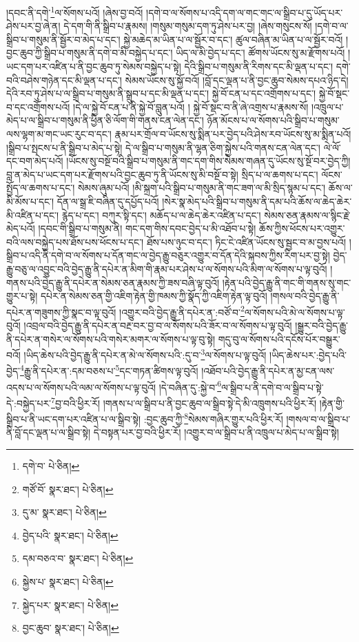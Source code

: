 །དབང་ནི་དགེ་\footnote{དགེ་བ་  པེ་ཅིན། }ལ་སོགས་པའོ། །ཞེས་བྱ་བའོ། །དགེ་བ་ལ་སོགས་པ་འདི་དག་ལ་གང་གང་ལ་སྒྲིབ་པ་དུ་ཡོད་པར་ཤེས་པར་བྱ་ཞེ་ན། དེ་དག་གི་ནི་སྒྲིབ་པ་རྣམས། །གསུམ་གསུམ་དག་ཏུ་ཤེས་པར་བྱ། །ཞེས་གསུངས་སོ། །དགེ་བ་ལ་སྒྲིབ་པ་གསུམ་ནི་སྦྱོར་བ་མེད་པ་དང་། སྐྱེ་མཆེད་མ་ཡིན་པ་ལ་སྦྱོར་བ་དང་། ཚུལ་བཞིན་མ་ཡིན་པ་ལ་སྦྱོར་བའོ། །བྱང་ཆུབ་ཀྱི་སྒྲིབ་པ་གསུམ་ནི་དགེ་བ་མི་བསྐྱེད་པ་དང་། ཡིད་ལ་མི་བྱེད་པ་དང་། ཚོགས་ཡོངས་སུ་མ་རྫོགས་པའོ། །ཡང་དག་པར་འཛིན་པ་ནི་བྱང་ཆུབ་ཏུ་སེམས་བསྐྱེད་པ་སྟེ། དེའི་སྒྲིབ་པ་གསུམ་ནི་རིགས་དང་མི་ལྡན་པ་དང་། དགེ་བའི་བཤེས་གཉེན་དང་མི་ལྡན་པ་དང་། སེམས་ཡོངས་སུ་སྐྱོ་བའོ། །བློ་དང་ལྡན་པ་ནི་བྱང་ཆུབ་སེམས་དཔའ་ཉིད་དེ། དེའི་རབ་ཏུ་ཤེས་པ་ལ་སྒྲིབ་པ་གསུམ་ནི་སྒྲུབ་པ་དང་མི་ལྡན་པ་དང་། སྐྱེ་བོ་ངན་པ་དང་འགྲོགས་པ་དང་། སྐྱེ་བོ་སྡང་བ་དང་འགྲོགས་པའོ། །དེ་ལ་སྐྱེ་བོ་ངན་པ་ནི་སྐྱེ་བོ་བླུན་པའོ། །
སྐྱེ་བོ་སྡང་བ་ནི་ཞེ་འགྲས་པ་རྣམས་སོ། །འཁྲུལ་པ་མེད་པ་ལ་སྒྲིབ་པ་གསུམ་ནི་ཕྱིན་ཅི་ལོག་གི་གནས་ངན་ལེན་དང་། ཉོན་མོངས་པ་ལ་སོགས་པའི་སྒྲིབ་པ་གསུམ་ལས་ལྷག་མ་གང་ཡང་རུང་བ་དང་། རྣམ་པར་གྲོལ་བ་ཡོངས་སུ་སྨིན་པར་བྱེད་པའི་ཤེས་རབ་ཡོངས་སུ་མ་སྨིན་པའོ། །སྒྲིབ་པ་སྤངས་པ་ནི་སྒྲིབ་པ་མེད་པ་སྟེ། དེ་ལ་སྒྲིབ་པ་གསུམ་ནི་ལྷན་ཅིག་སྐྱེས་པའི་གནས་ངན་ལེན་དང་། ལེ་ལོ་དང་བག་མེད་པའོ། །ཡོངས་སུ་བསྔོ་བའི་སྒྲིབ་པ་གསུམ་ནི་གང་དག་གིས་སེམས་གཞན་དུ་ཡོངས་སུ་སྔོ་བར་བྱེད་ཀྱི། བླ་ན་མེད་པ་ཡང་དག་པར་རྫོགས་པའི་བྱང་ཆུབ་ཏུ་ནི་ཡོངས་སུ་མི་བསྔོ་བ་སྟེ། སྲིད་པ་ལ་ཆགས་པ་དང་། ལོངས་སྤྱོད་ལ་ཆགས་པ་དང་། སེམས་ཞུམ་པའོ། །མི་སྐྲག་པའི་སྒྲིབ་པ་གསུམ་ནི་གང་ཟག་ལ་མི་སྲིད་སྙམ་པ་དང་། ཆོས་ལ་མི་མོས་པ་དང་། དོན་ལ་སྒྲ་ཇི་བཞིན་དུ་དཔྱོད་པའོ། །སེར་སྣ་མེད་པའི་སྒྲིབ་པ་གསུམ་ནི་དམ་པའི་ཆོས་ལ་ཆེད་ཆེར་མི་འཛིན་པ་དང་། རྙེད་པ་དང་། བཀུར་སྟི་དང་། མཆོད་པ་ལ་ཆེད་ཆེར་འཛིན་པ་དང་། སེམས་ཅན་རྣམས་ལ་སྙིང་རྗེ་མེད་པའོ། །དབང་གི་སྒྲིབ་པ་གསུམ་ནི། གང་དག་གིས་དབང་བྱེད་པ་མི་འཐོབ་པ་སྟེ། ཆོས་ཀྱིས་ཕོངས་པར་འགྱུར་བའི་ལས་བསྐྱེད་པས་ཐོས་པས་ཕོངས་པ་དང་། ཐོས་པས་ཉུང་བ་དང་། ཏིང་ངེ་འཛིན་ཡོངས་སུ་སྦྱང་བ་མ་བྱས་པའོ། །སྒྲིབ་པ་འདི་ནི་དགེ་བ་ལ་སོགས་པ་དོན་གང་ལ་བྱེད་རྒྱུ་བཅུར་འགྱུར་བ་དོན་དེའི་སྐབས་ཀྱིས་རིག་པར་བྱ་སྟེ། བྱེད་རྒྱུ་བཅུ་ལ་འབྱུང་བའི་བྱེད་རྒྱུ་ནི་དཔེར་ན་མིག་གི་རྣམ་པར་ཤེས་པ་ལ་སོགས་པའི་མིག་ལ་སོགས་པ་ལྟ་བུའོ། །གནས་པའི་བྱེད་རྒྱུ་ནི་དཔེར་ན་སེམས་ཅན་རྣམས་ཀྱི་ཟས་བཞི་ལྟ་བུའོ། །རྟེན་པའི་བྱེད་རྒྱུ་ནི་གང་གི་གནས་སུ་གང་གྱུར་པ་སྟེ། དཔེར་ན་སེམས་ཅན་གྱི་འཇིག་རྟེན་གྱི་ཁམས་ཀྱི་སྣོད་ཀྱི་འཇིག་རྟེན་ལྟ་བུའོ། །གསལ་བའི་བྱེད་རྒྱུ་ནི་དཔེར་ན་གཟུགས་ཀྱི་སྣང་བ་ལྟ་བུའོ། །འགྱུར་བའི་བྱེད་རྒྱུ་ནི་དཔེར་ན་:བཙོ་བ་\footnote{གཙོ་བོ་  སྣར་ཐང་།  པེ་ཅིན། }ལ་སོགས་པའི་མེ་ལ་སོགས་པ་ལྟ་བུའོ། །འབྲལ་བའི་བྱེད་རྒྱུ་ནི་དཔེར་ན་བརྔ་བར་བྱ་བ་ལ་སོགས་པའི་ཟོར་བ་ལ་སོགས་པ་ལྟ་བུའོ། །སྒྱུར་བའི་བྱེད་རྒྱུ་ནི་དཔེར་ན་གསེར་ལ་སོགས་པའི་གསེར་མགར་ལ་སོགས་པ་ལྟ་བུ་སྟེ། གདུ་བུ་ལ་སོགས་པའི་དངོས་པོར་བསྒྱུར་བའོ། །ཡིད་ཆེས་པའི་བྱེད་རྒྱུ་ནི་དཔེར་ན་མེ་ལ་སོགས་པའི་:དུ་བ་\footnote{དུ་མ་  སྣར་ཐང་།  པེ་ཅིན། }ལ་སོགས་པ་ལྟ་བུའོ། །ཡིད་ཆེས་པར་:བྱེད་པའི་བྱེད་\footnote{བྱེད་པའི་  སྣར་ཐང་།  པེ་ཅིན། }རྒྱུ་ནི་དཔེར་ན་:དམ་བཅས་པ་\footnote{དམ་བཅའ་བ་  སྣར་ཐང་།  པེ་ཅིན། }དང་གཏན་ཚིགས་ལྟ་བུའོ། །འཐོབ་པའི་བྱེད་རྒྱུ་ནི་དཔེར་ན་མྱ་ངན་ལས་འདས་པ་ལ་སོགས་པའི་ལམ་ལ་སོགས་པ་ལྟ་བུའོ། །དེ་བཞིན་དུ་:སྐྱེ་བ་\footnote{སྐྱེས་པ་  སྣར་ཐང་།  པེ་ཅིན། }ལ་སྒྲིབ་པ་ནི་དགེ་བ་ལ་སྒྲིབ་པ་སྟེ་དེ་:བསྐྱེད་པར་\footnote{སྐྱེད་པར་  སྣར་ཐང་།  པེ་ཅིན། }བྱ་བའི་ཕྱིར་རོ། །གནས་པ་ལ་སྒྲིབ་པ་ནི་བྱང་ཆུབ་ལ་སྒྲིབ་སྟེ་དེ་མི་འཁྲུགས་པའི་ཕྱིར་རོ། །རྟེན་གྱི་སྒྲིབ་པ་ནི་ཡང་དག་པར་འཛིན་པ་ལ་སྒྲིབ་སྟེ། :བྱང་ཆུབ་ཀྱི་\footnote{བྱང་ཆུབ་  སྣར་ཐང་།  པེ་ཅིན། }སེམས་གཞིར་གྱུར་པའི་ཕྱིར་རོ། །གསལ་བ་ལ་སྒྲིབ་པ་ནི་བློ་དང་ལྡན་པ་ལ་སྒྲིབ་སྟེ། དེ་བསྟན་པར་བྱ་བའི་ཕྱིར་རོ། །འགྱུར་བ་ལ་སྒྲིབ་པ་ནི་འཁྲུལ་པ་མེད་པ་ལ་སྒྲིབ་སྟེ། 